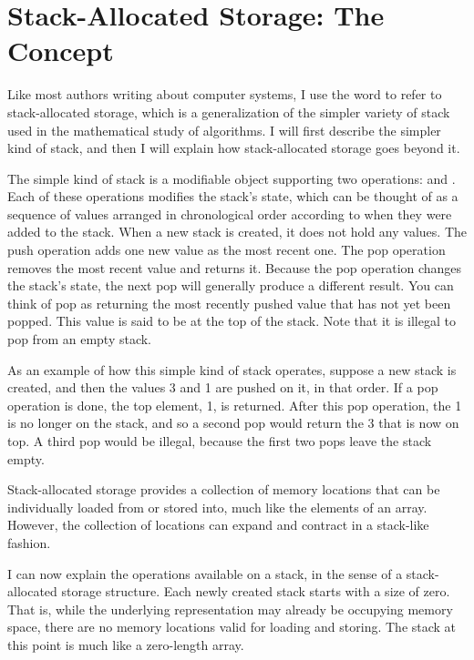\section{Stack-Allocated Storage: The Concept}\label{stacks-abstract-section}

Like most authors writing about computer systems, I use the word
 to refer to stack-allocated storage, which is a
generalization of the simpler variety of stack used in the
mathematical study of algorithms.  I will first describe the
simpler kind of stack, and then I will explain how stack-allocated storage goes
beyond it.

The simple kind of stack is a modifiable object supporting two
operations:  and .  Each of these operations
modifies the stack's state, which can be thought of as a sequence of
values arranged in chronological order according to when they were added to
the stack.  When a new stack is created, it does not hold any values.
The push operation adds one new value as the most recent one.  The pop
operation removes the most recent value and returns it.  Because the
pop operation changes the stack's state, the next pop will generally
produce a different result.  You can think of pop as returning the
most recently pushed value that has not yet been popped.  This value
is said to be at the top of the stack.  Note that it is illegal to pop from an
empty stack.

As an example of how this simple kind of stack operates, suppose a new stack is created, and then
the values 3 and 1 are pushed on it, in that order.  If a pop
operation is done, the top element, 1, is returned.  After this pop
operation, the 1 is no longer on the stack, and so a second pop would
return the 3 that is now on top.  A third pop would be illegal, because the
first two pops leave the stack empty.

Stack-allocated storage provides a collection of memory locations that
can be individually loaded from or stored into, much like the elements
of an array.  However, the collection of locations can expand and
contract in a stack-like fashion.

I can now explain the operations available on a stack, in the sense of
a stack-allocated storage structure.  Each newly created stack starts
with a size of zero.  That is, while the underlying representation may
already be occupying memory space, there are no memory locations valid
for loading and storing.  The stack at this point is much like a
zero-length array.

